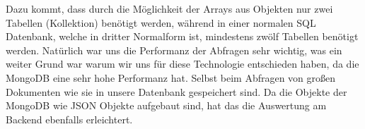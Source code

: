 Dazu kommt, dass durch die Möglichkeit der Arrays aus Objekten nur zwei Tabellen (Kollektion) benötigt werden, während in einer normalen SQL Datenbank, welche in dritter Normalform ist, mindestens zwölf Tabellen benötigt werden. 
Natürlich war uns die Performanz der Abfragen sehr wichtig, was ein weiter Grund war warum wir uns für diese Technologie entschieden haben, da die MongoDB eine sehr hohe Performanz hat. Selbst beim Abfragen von großen Dokumenten wie sie in unsere Datenbank gespeichert sind. 
Da die Objekte der MongoDB wie JSON Objekte aufgebaut sind, hat das die Auswertung am Backend ebenfalls erleichtert.
\newpage